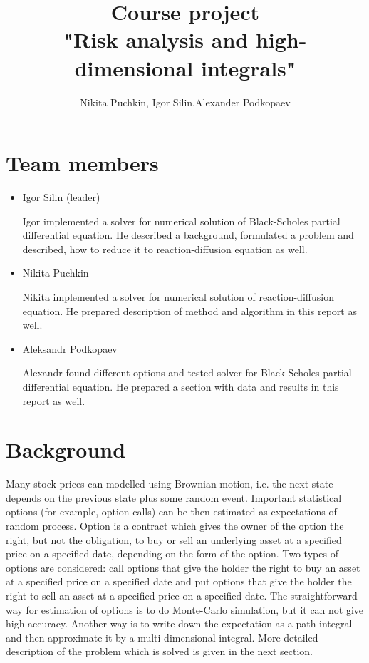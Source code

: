 \documentclass[11pt,a4paper]{extarticle}
\title{Course project \\
"Risk analysis and high-dimensional integrals"}
\author{ Nikita Puchkin, Igor Silin,Alexander Podkopaev }
\begin{document}
\maketitle

\section{Team members}

\begin{itemize}

\item Igor Silin (leader)

Igor implemented a solver for numerical solution of Black-Scholes partial differential equation.
He described a background, formulated a problem and described, how to reduce it to reaction-diffusion equation as well.

\item Nikita Puchkin

Nikita implemented a solver for numerical solution of reaction-diffusion equation.
He prepared description of method and algorithm in this report as well. 

\item Aleksandr Podkopaev

Alexandr found different options and tested solver for Black-Scholes partial differential equation.
He prepared a section with data and results in this report as well.

\end{itemize}

\section{Background}

Many stock prices can modelled using Brownian motion, i.e. the next state depends on the previous state plus some random event. Important statistical options (for example, option calls) can be then estimated as expectations of random process. Option is a contract which gives the owner of the option the right, but not the obligation, to buy or sell an underlying asset at a specified price on a specified date, depending on the form of the option. Two types of options are considered: call options that give the holder the right to buy an asset at a specified price on a specified date and put options that give the holder the right to sell an asset at a specified price on a specified date. The straightforward way for estimation of options is to do Monte-Carlo simulation, but it can not give high accuracy. Another way is to write down the expectation as a path integral and then approximate it by a multi-dimensional integral. More detailed description of the problem which is solved is given in the next section.
\end{document}
